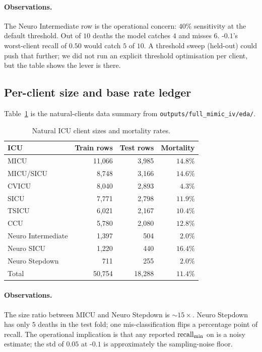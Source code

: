 \paragraph{Observations.}
The Neuro Intermediate row is the operational concern: $40\%$
sensitivity at the default threshold. Out of $10$ deaths the model
catches $4$ and misses $6$. \fedprox{}-$0.1$'s worst-client recall
of $0.50$ would catch $5$ of $10$. A threshold sweep (held-out)
could push that further; we did not run an explicit threshold
optimisation per client, but the table shows the lever is there.

\subsection{Per-client size and base rate ledger}

Table~\ref{tab:per-client-size} is the natural-clients data summary
from \texttt{outputs/full\_mimic\_iv/eda/}.

\begin{table}[h]
\centering
\caption{Natural ICU client sizes and mortality rates.}
\label{tab:per-client-size}
\small
\begin{tabular}{l r r r}
\toprule
ICU                & Train rows & Test rows & Mortality \\
\midrule
MICU               & 11{,}066 & 3{,}985 & $14.8\%$ \\
MICU/SICU          &  8{,}748 & 3{,}166 & $14.6\%$ \\
CVICU              &  8{,}040 & 2{,}893 & $4.3\%$ \\
SICU               &  7{,}771 & 2{,}798 & $11.9\%$ \\
TSICU              &  6{,}021 & 2{,}167 & $10.4\%$ \\
CCU                &  5{,}780 & 2{,}080 & $12.8\%$ \\
Neuro Intermediate &  1{,}397 &   504 & $2.0\%$ \\
Neuro SICU         &  1{,}220 &   440 & $16.4\%$ \\
Neuro Stepdown     &    711 &   255 & $2.0\%$ \\
\midrule
Total              & 50{,}754 & 18{,}288 & $11.4\%$ \\
\bottomrule
\end{tabular}
\end{table}

\paragraph{Observations.}
The size ratio between MICU and Neuro Stepdown is $\sim$$15\!\times$.
Neuro Stepdown has only $5$ deaths in the test fold; one
mis-classification flips a percentage point of recall. The
operational implication is that any reported $\text{recall}_{\min}{}$ on
\mimic{} is a noisy estimate; the std of $0.05$ at \fedprox{}-$0.1$
is approximately the sampling-noise floor.

